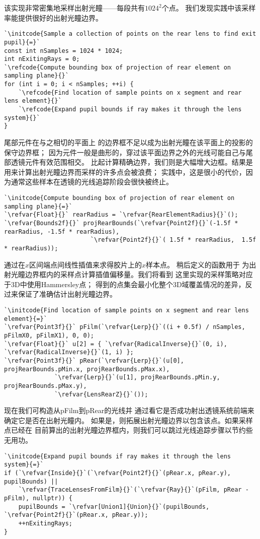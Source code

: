 该实现非常密集地采样出射光瞳——每段共有$1024^2$个点。
我们发现实践中该采样率能提供很好的出射光瞳边界。
\begin{lstlisting}
`\initcode{Sample a collection of points on the rear lens to find exit pupil}{=}`
const int nSamples = 1024 * 1024;
int nExitingRays = 0;
`\refcode{Compute bounding box of projection of rear element on sampling plane}{}`
for (int i = 0; i < nSamples; ++i) {
    `\refcode{Find location of sample points on x segment and rear lens element}{}`
    `\refcode{Expand pupil bounds if ray makes it through the lens system}{}`
}
\end{lstlisting}

尾部元件在与之相切的平面上
的边界框不足以成为出射光瞳在该平面上的投影的保守边界框；
因为元件一般是曲形的，穿过该平面边界之外的光线可能自己与尾部透镜元件有效范围相交。
比起计算精确边界，我们则是大幅增大边框。结果是用来计算出射光瞳边界而采样的许多点会被浪费；
实践中，这是很小的代价，因为通常这些样本在透镜的光线追踪阶段会很快被终止。
\begin{lstlisting}
`\initcode{Compute bounding box of projection of rear element on sampling plane}{=}`
`\refvar{Float}{}` rearRadius = `\refvar{RearElementRadius}{}`();
`\refvar{Bounds2f}{}` projRearBounds(`\refvar{Point2f}{}`(-1.5f * rearRadius, -1.5f * rearRadius),
                        `\refvar{Point2f}{}`( 1.5f * rearRadius,  1.5f * rearRadius));
\end{lstlisting}

通过在$x$区间端点间线性插值来求得胶片上的$x$样本点。
稍后定义的函数用于
为出射光瞳边界框内的采样点计算插值偏移量。我们将看到
这里实现的采样策略对应于3D中使用Hammersley点；
得到的点集会最小化整个3D域覆盖情况的差异，反过来保证了准确估计出射光瞳边界。
\begin{lstlisting}
`\initcode{Find location of sample points on x segment and rear lens element}{=}`
`\refvar{Point3f}{}` pFilm(`\refvar{Lerp}{}`((i + 0.5f) / nSamples, pFilmX0, pFilmX1), 0, 0);
`\refvar{Float}{}` u[2] = { `\refvar{RadicalInverse}{}`(0, i), `\refvar{RadicalInverse}{}`(1, i) };
`\refvar{Point3f}{}` pRear(`\refvar{Lerp}{}`(u[0], projRearBounds.pMin.x, projRearBounds.pMax.x),
              `\refvar{Lerp}{}`(u[1], projRearBounds.pMin.y, projRearBounds.pMax.y),
              `\refvar{LensRearZ}{}`());
\end{lstlisting}

现在我们可构造从{\ttfamily pFilm}到{\ttfamily pRear}的光线并
通过看它是否成功射出透镜系统前端来确定它是否在出射光瞳内。
如果是，则拓展出射光瞳边界以包含该点。如果采样点已经在
目前算出的出射光瞳边界框内，则我们可以跳过光线追踪步骤以节约些无用功。
\begin{lstlisting}
`\initcode{Expand pupil bounds if ray makes it through the lens system}{=}`
if (`\refvar{Inside}{}`(`\refvar{Point2f}{}`(pRear.x, pRear.y), pupilBounds) ||
    `\refvar{TraceLensesFromFilm}{}`(`\refvar{Ray}{}`(pFilm, pRear - pFilm), nullptr)) {
    pupilBounds = `\refvar[Union1]{Union}{}`(pupilBounds, `\refvar{Point2f}{}`(pRear.x, pRear.y));
    ++nExitingRays;
}
\end{lstlisting}

